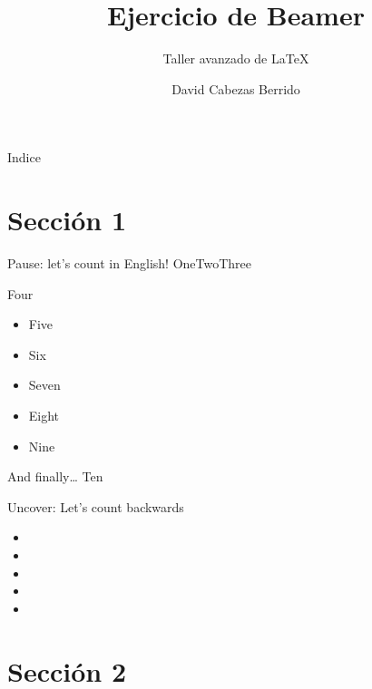 \documentclass{beamer}
\title{Ejercicio de Beamer}
\subtitle{Taller avanzado de \LaTeX}
\author{David Cabezas Berrido}
\begin{document}
\begin{frame}[plain]
\titlepage
\end{frame}

\begin{frame}{Indice}
\tableofcontents
\end{frame}

\section{Sección 1}

\begin{frame}{Pause: let's count in English!}
One\pause\quad Two\pause\quad Three\pause

Four\pause

\begin{itemize}
    \item Five\pause
    \item Six\pause
    \item Seven\pause
    \item Eight\pause
    \item Nine\pause
\end{itemize}
    
\begin{block}{And finally\ldots}
    Ten
\end{block}    
    
\end{frame}

\begin{frame}{Uncover: Let's count backwards}
    \quad {} 
\begin{itemize}
    \item {}
    \item {} 
    \item {}
    \item {}
    \item {}
\end{itemize}
\end{frame}

\section{Sección 2}
\end{document}
